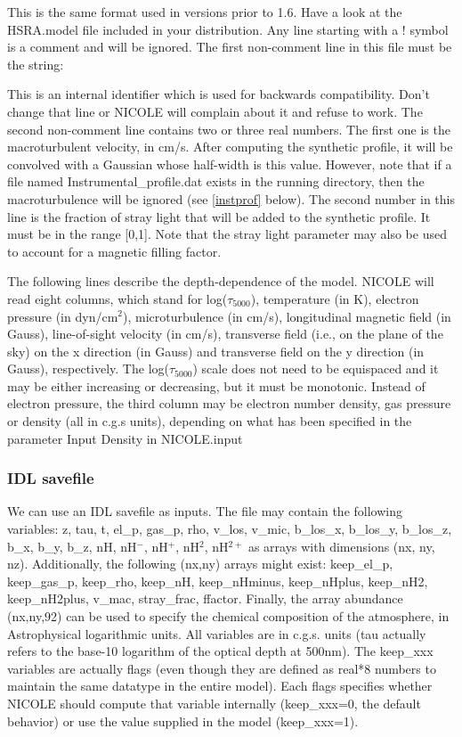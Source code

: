 This is the same format used in versions prior to 1.6. Have a look at
the HSRA.model file included in your distribution.  Any line starting
with a ! symbol is a comment and will be ignored.  The first
non-comment line in this file must be the string:

\vskip12pt
\vskip12pt

This is an internal identifier which is used for backwards
compatibility.  Don't change that line or NICOLE will complain about
it and refuse to work.  The second non-comment line contains two or
three real numbers. The first one is the macroturbulent velocity, in
cm/s. After computing the synthetic profile, it will be convolved with
a Gaussian whose half-width is this value. However, note that if a
file named Instrumental\_profile.dat exists in the running directory,
then the macroturbulence will be ignored (see \ref{instprof}
below). The second 
number in this line is the fraction of stray light that will be added
to the synthetic profile. It must be in the range [0,1]. Note that the
stray light parameter may also be used to account for a magnetic
filling factor. 

The following lines describe the depth-dependence of the model.
NICOLE will read eight columns, which stand for log($\tau_{5000}$),
temperature (in K), electron pressure (in dyn/cm$^2$), microturbulence
(in cm/s), longitudinal magnetic field (in Gauss), line-of-sight
velocity (in cm/s), transverse field (i.e., on the plane of the sky)
on the x direction (in Gauss) and transverse field on the y direction
(in Gauss), respectively.  The log($\tau_{5000}$) scale does not need
to be equispaced and it may be either increasing or decreasing, but it
must be monotonic. Instead of electron pressure, the third column may
be electron number density, gas pressure or density (all in c.g.s
units), depending on what has been specified in the parameter Input
Density in NICOLE.input

\subsubsection{IDL savefile}

We can use an IDL savefile as inputs. The file may contain the
following variables: z, tau, t, el\_p, gas\_p, rho, v\_los, v\_mic,
b\_los\_x, b\_los\_y, b\_los\_z, b\_x, b\_y, b\_z, nH, nH$^-$, nH$^+$,
nH$^2$, nH$^{2+}$ as arrays with dimensions (nx, ny,
nz). Additionally, the following (nx,ny) arrays might exist:
keep\_el\_p, keep\_gas\_p, keep\_rho, keep\_nH, keep\_nHminus,
keep\_nHplus, keep\_nH2, keep\_nH2plus, v\_mac, stray\_frac,
ffactor. Finally, the array abundance (nx,ny,92) can be used to
specify the chemical composition of the atmosphere, in Astrophysical
logarithmic units. All variables are in c.g.s. units (tau actually
refers to the base-10 logarithm of the optical depth at 500nm). The
keep\_xxx variables are actually flags (even though they are defined
as real*8 numbers to maintain the same datatype in the entire
model). Each flags specifies whether NICOLE should compute that
variable internally (keep\_xxx=0, the default behavior) or use the
value supplied in the model (keep\_xxx=1).

